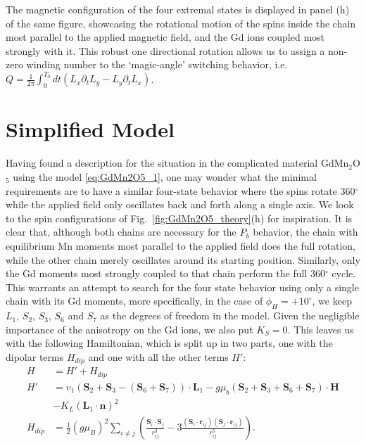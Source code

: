 The magnetic configuration of the four extremal states is displayed in panel (h) of the same figure, showcasing the rotational motion of the spins inside the chain most parallel to the applied magnetic field, and the Gd ions coupled most strongly with it.
This robust one directional rotation allows us to assign a non-zero winding number to the `magic-angle' switching behavior, i.e. $Q=\frac{1}{2\pi}\int_0^{T_0} dt (L_x\partial_t L_y - L_y \partial_t L_x)$. 

\section{Simplified Model}
Having found a description for the situation in the complicated material GdMn$_2$O$_5$ using the model \ref{eq:GdMn2O5_1}, one may wonder what the minimal requirements are to have a similar four-state behavior where the spins rotate 360$^\circ$ while the applied field only oscillates back and forth along a single axis.
We look to the spin configurations of Fig.~\ref{fig:GdMn2O5_theory}(h) for inspiration.
It is clear that, although both chains are necessary for the $P_b$ behavior, the chain with equilibrium Mn moments most parallel to the applied field does the full rotation, while the other chain merely oscillates around its starting position.
Similarly, only the Gd moments most strongly coupled to that chain perform the full 360$^\circ$ cycle.
This warrants an attempt to search for the four state behavior using only a single chain with its Gd moments, more specifically, in the case of $\phi_H = +10^\circ$, we keep $L_1$, $S_2$, $S_3$, $S_6$ and $S_7$ as the degrees of freedom in the model.
Given the negligible importance of the anisotropy on the Gd ions, we also put $K_S = 0$.
This leaves us with the following Hamiltonian, which is split up in two parts, one with the dipolar terms $H_{dip}$ and one with all the other terms $H'$:
\begin{align}
	H &= H' + H_{dip} \\
	H' &= v_1(\mathbf{S}_2 + \mathbf{S}_3 - (\mathbf{S}_6 + \mathbf{S}_7))\cdot\mathbf{L}_1 - g \mu_b (\mathbf{S}_2 + \mathbf{S}_3 + \mathbf{S}_6 + \mathbf{S}_7) \cdot \mathbf{H} \\
	&- K_L (\mathbf{L}_1 \cdot \mathbf{n})^2 \\
	H_{dip} &= \frac{1}{2}(g \mu_B)^2\sum_{i\neq j}\left(\frac{\mathbf{S}_i\cdot \mathbf{S}_j}{r_{ij}^3}-3\frac{(\mathbf{S}_i\cdot \mathbf{r}_{ij})(\mathbf{S}_j\cdot \mathbf{r}_{ij})}{r_{ij}^5}\right).
\end{align}


